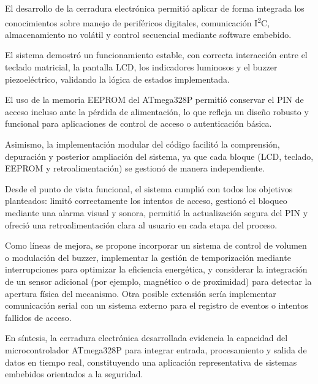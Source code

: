 El desarrollo de la cerradura electrónica permitió aplicar de forma integrada los conocimientos sobre manejo de periféricos digitales, comunicación I\textsuperscript{2}C, almacenamiento no volátil y control secuencial mediante software embebido. 

El sistema demostró un funcionamiento estable, con correcta interacción entre el teclado matricial, la pantalla LCD, los indicadores luminosos y el buzzer piezoeléctrico, validando la lógica de estados implementada.

El uso de la memoria EEPROM del ATmega328P permitió conservar el PIN de acceso incluso ante la pérdida de alimentación, lo que refleja un diseño robusto y funcional para aplicaciones de control de acceso o autenticación básica. 

Asimismo, la implementación modular del código facilitó la comprensión, depuración y posterior ampliación del sistema, ya que cada bloque (LCD, teclado, EEPROM y retroalimentación) se gestionó de manera independiente.

Desde el punto de vista funcional, el sistema cumplió con todos los objetivos planteados: limitó correctamente los intentos de acceso, gestionó el bloqueo mediante una alarma visual y sonora, permitió la actualización segura del PIN y ofreció una retroalimentación clara al usuario en cada etapa del proceso. 

Como líneas de mejora, se propone incorporar un sistema de control de volumen o modulación del buzzer, implementar la gestión de temporización mediante interrupciones para optimizar la eficiencia energética, y considerar la integración de un sensor adicional (por ejemplo, magnético o de proximidad) para detectar la apertura física del mecanismo. Otra posible extensión sería implementar comunicación serial con un sistema externo para el registro de eventos o intentos fallidos de acceso.

En síntesis, la cerradura electrónica desarrollada evidencia la capacidad del microcontrolador ATmega328P para integrar entrada, procesamiento y salida de datos en tiempo real, constituyendo una aplicación representativa de sistemas embebidos orientados a la seguridad.
